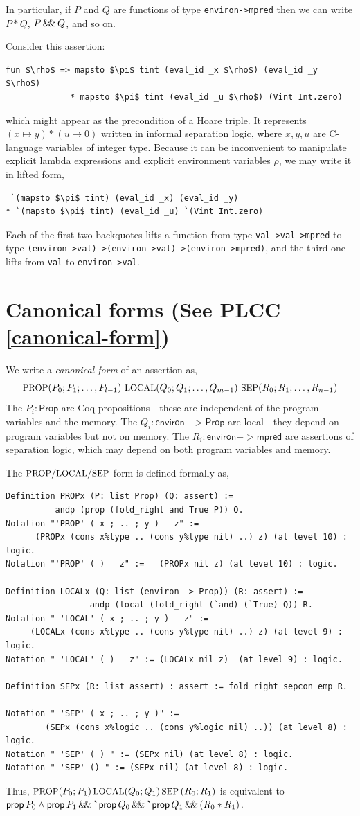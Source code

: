\documentclass[12pt,fleqn,openany,oneside,showtrims]{memoir}
\newcommand{\ychapter}[2]{\chapter[#1]{#1 \hfill \normalsize #2}}
\begin{document}
In particular, if $P$ and $Q$ are functions of type \lstinline{environ->mpred}
then we can write $P*Q$,  $P \,\mathsf{\&\hspace{-.2em}\&}\, Q$, and so on.

Consider this assertion:
\begin{lstlisting}
fun $\rho$ => mapsto $\pi$ tint (eval_id _x $\rho$) (eval_id _y $\rho$)
             * mapsto $\pi$ tint (eval_id _u $\rho$) (Vint Int.zero)
\end{lstlisting}
which might appear as the precondition of a Hoare triple.
It represents $(x\mapsto y) *(u\mapsto 0)$ written in informal
separation logic, where $x,y,u$ are C-language variables
of integer type.
Because it can be inconvenient to manipulate explicit lambda expressions
and explicit environment variables $\rho$, we may write it in lifted
form,
\begin{lstlisting}
 `(mapsto $\pi$ tint) (eval_id _x) (eval_id _y)
* `(mapsto $\pi$ tint) (eval_id _u) `(Vint Int.zero)
\end{lstlisting}
Each of the first two backquotes lifts a function
from type \lstinline{val->val->mpred} to type
\lstinline{(environ->val)->(environ->val)->(environ->mpred)},
and the third one lifts from \lstinline{val} to
\lstinline{environ->val}.

\ychapter{Canonical forms}{(See PLCC \autoref{canonical-form})}
We write a \emph{canonical form} of an assertion as,
\[
\mbox{\small PROP}(P_0;P_1;\ldots,P_{l-1})~
\mbox{\small LOCAL}(Q_0;Q_1;\ldots,Q_{m-1})~
\mbox{\small SEP}(R_0;R_1;\ldots,R_{n-1})
\]
The $P_i : \mathsf{Prop}$ are Coq propositions---these are independent
of the program variables and the memory.
The $Q_i : \mathsf{environ}->\mathsf{Prop}$ are local---they depend on
program variables but not on memory.
The $R_i: \mathsf{environ}->\mathsf{mpred}$ are
assertions of separation logic,
which may depend on both program variables and memory.

The $\mbox{\small PROP}/\mbox{\small LOCAL}/\mbox{\small SEP}$ form is defined formally as,
\begin{lstlisting}
Definition PROPx (P: list Prop) (Q: assert) :=
          andp (prop (fold_right and True P)) Q.
Notation "'PROP' ( x ; .. ; y )   z" :=
      (PROPx (cons x%type .. (cons y%type nil) ..) z) (at level 10) : logic.
Notation "'PROP' ( )   z" :=   (PROPx nil z) (at level 10) : logic.

Definition LOCALx (Q: list (environ -> Prop)) (R: assert) :=
                 andp (local (fold_right (`and) (`True) Q)) R.
Notation " 'LOCAL' ( x ; .. ; y )   z" :=
     (LOCALx (cons x%type .. (cons y%type nil) ..) z) (at level 9) : logic.
Notation " 'LOCAL' ( )   z" := (LOCALx nil z)  (at level 9) : logic.

Definition SEPx (R: list assert) : assert := fold_right sepcon emp R.

Notation " 'SEP' ( x ; .. ; y )" :=
        (SEPx (cons x%logic .. (cons y%logic nil) ..)) (at level 8) : logic.
Notation " 'SEP' ( ) " := (SEPx nil) (at level 8) : logic.
Notation " 'SEP' () " := (SEPx nil) (at level 8) : logic.
\end{lstlisting}
Thus,
$\mbox{\small PROP} (P_0;P_1)\,\mbox{\small LOCAL}(Q_0;Q_1)\,\mbox{\small SEP}\,(R_0;R_1)$
is equivalent to
$\mathsf{prop}\,P_0\wedge \mathsf{prop}\,P_1 \,\mathsf{\&\hspace{-.2em}\&}\,
\mbox{\textbf{\`{}}}\mathsf{prop}\,Q_0 \,\mathsf{\&\hspace{-.2em}\&}\, \mbox{\textbf{\`{}}}\mathsf{prop}\,Q_1 \,\mathsf{\&\hspace{-.2em}\&}\,
(R_0 * R_1)$.
\end{document}
